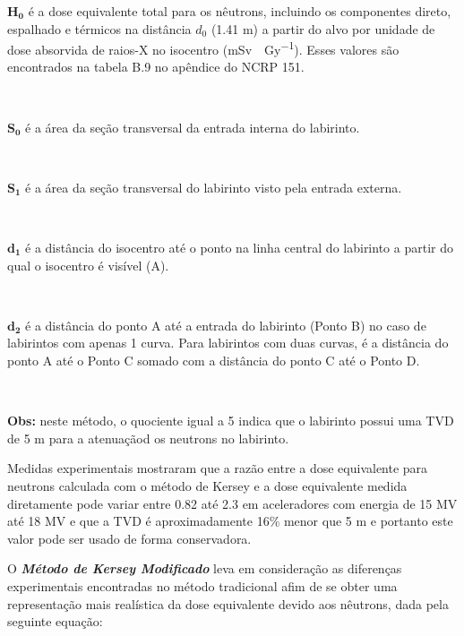 \documentclass[11pt,a4paper]{article}
\newcounter{exemplo}
\begin{document}
        \begin{exemplo}[onde:]
            \textcolor{CarnationPink}{$\mathbf{H_0}$} é a dose equivalente total para os nêutrons, incluindo os componentes direto, espalhado e térmicos na distância $d_0$ (1.41 m) a partir do alvo por unidade de dose absorvida de raios-X no isocentro (\unit{mSv \cdot Gy^{-1}}). Esses valores são encontrados na tabela B.9 no apêndice do NCRP 151.

            \

            \textcolor{CarnationPink}{$\mathbf{S_0}$} é a área da seção transversal da entrada interna do labirinto.

            \

            \textcolor{CarnationPink}{$\mathbf{S_1}$} é a área da seção transversal do labirinto visto pela entrada externa.

            \

            \textcolor{CarnationPink}{$\mathbf{d_1}$} é a distância do isocentro até o ponto na linha central do labirinto a partir do qual o isocentro é visível (A).

            \

            \textcolor{CarnationPink}{$\mathbf{d_2}$} é a distância do ponto A até a entrada do labirinto (Ponto B) no caso de labirintos com apenas 1 curva. Para labirintos com duas curvas, é a distância do ponto A até o Ponto C somado com a distância do ponto C até o Ponto D.

            \

            \textcolor{CarnationPink}{\textbf{Obs:}} neste método, o quociente igual a 5 indica que o labirinto possui uma TVD de 5 m para a atenuaçãod os neutrons no labirinto. 

        \end{exemplo}

        Medidas experimentais mostraram que a razão entre a dose equivalente para neutrons calculada com o método de Kersey e a dose equivalente medida diretamente pode variar entre 0.82 até 2.3 em aceleradores com energia de 15 MV até 18 MV e que a TVD é aproximadamente 16\% menor que 5 m e portanto este valor pode ser usado de forma conservadora.

        O \textcolor{CarnationPink}{\textbf{\textit{Método de Kersey Modificado}}} leva em consideração as diferenças experimentais encontradas no método tradicional afim de se obter uma representação mais realística da dose equivalente devido aos nêutrons, dada pela seguinte equação:
\end{document}
